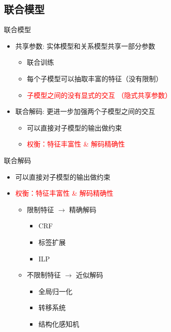 \documentclass{beamer}
\begin{document}
\subsection*{联合模型}
\begin{frame}{联合模型}

	\begin{itemize}
        \item 共享参数: 实体模型和关系模型共享一部分参数 \cite{miwa2016end,katiyar2017going}
            \begin{itemize}
                \item 联合训练
                \item \textcolor{truecolor}{每个子模型可以抽取丰富的特征（没有限制）}
                \item \textcolor{red}{子模型之间的没有显式的交互 （隐式共享参数）}
            \end{itemize}
        \item 联合解码: 更进一步加强两个子模型之间的交互
            \begin{itemize}
                \item \textcolor{truecolor}{可以直接对子模型的输出做约束}
                \item \textcolor{red}{权衡：特征丰富性 \& 解码精确性}
            \end{itemize}
	\end{itemize}
\end{frame}

\begin{frame}{联合解码}

    \begin{itemize}
        \item \textcolor{truecolor}{可以直接对子模型的输出做约束}
        \item \textcolor{red}{权衡：特征丰富性 \& 解码精确性}
            \begin{itemize}
                \item  限制特征 $\rightarrow$ 精确解码 
                    \begin{itemize}
                        \item CRF \cite{katiyar2016investigating}
                        \item 标签扩展\cite{zheng2017joint}
                        \item ILP\cite{yang2013joint}
                    \end{itemize}
                \item  不限制特征 $\rightarrow$ 近似解码 
                    \begin{itemize}
                        \item 全局归一化\cite{zhang2017end}
                        \item 转移系统\cite{wang2018joint}
                        \item 结构化感知机\cite{li2014incremental}
                    \end{itemize}
            \end{itemize}
    \end{itemize}
\end{frame}
\end{document}
